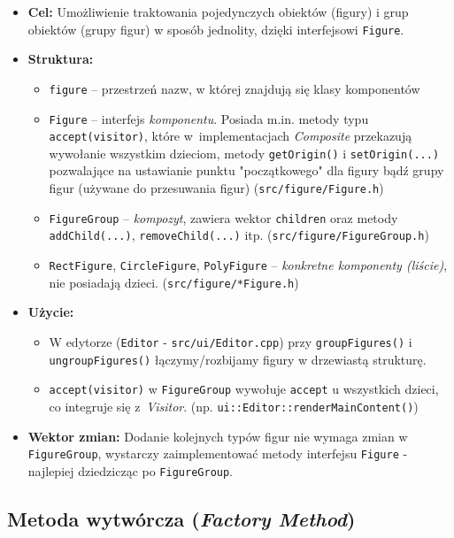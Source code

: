 \documentclass[a4paper,12pt]{article}
\begin{document}
\begin{itemize}
    \item \textbf{Cel:} Umożliwienie traktowania pojedynczych obiektów
    (figury) i grup obiektów (grupy figur) w sposób jednolity, dzięki interfejsowi
    \texttt{Figure}. 
    \item \textbf{Struktura:} 

    \begin{itemize}
      \item \texttt{figure} -- przestrzeń nazw, w której znajdują się klasy komponentów
      \item \texttt{Figure} -- interfejs \emph{komponentu}. Posiada m.in.
        metody typu \texttt{accept(visitor)}, które w~implementacjach
        \emph{Composite} przekazują wywołanie wszystkim dzieciom, metody
        \verb|getOrigin()| i \verb|setOrigin(...)| pozwalające na ustawianie
        punktu "początkowego" dla figury bądź grupy figur (używane do
        przesuwania figur) (\verb|src/figure/Figure.h|)
      \item \texttt{FigureGroup} -- \emph{kompozyt}, zawiera wektor \texttt{children}
      oraz metody \texttt{addChild(...)},  \texttt{removeChild(...)} itp. (\verb|src/figure/FigureGroup.h|)
      \item \texttt{RectFigure}, \texttt{CircleFigure}, \texttt{PolyFigure} -- 
      \emph{konkretne komponenty (liście)}, nie posiadają dzieci. (\verb|src/figure/*Figure.h|)
    \end{itemize}
    \item \textbf{Użycie:} 
    \begin{itemize}
      \item W edytorze (\texttt{Editor} - \verb|src/ui/Editor.cpp|) przy
        \texttt{groupFigures()} i \texttt{ungroupFigures()} łączymy/rozbijamy
        figury w drzewiastą strukturę.
      \item \texttt{accept(visitor)} w \texttt{FigureGroup} wywołuje
        \texttt{accept} u wszystkich dzieci, co integruje się z~\emph{Visitor}.
        (np. \verb|ui::Editor::renderMainContent()|)
    \end{itemize}
    \item \textbf{Wektor zmian:} Dodanie kolejnych typów figur nie wymaga zmian
      w \texttt{FigureGroup}, wystarczy zaimplementować metody interfejsu 
      \texttt{Figure} - najlepiej dziedzicząc po \texttt{FigureGroup}.
\end{itemize}

\subsection{Metoda wytwórcza (\emph{Factory Method})}
\end{document}
